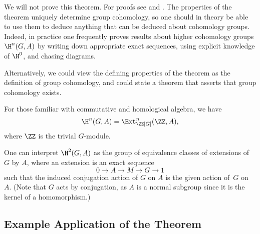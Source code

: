 We will not prove this theorem.  For proofs see
\cite[Atiyah-Wall]{cassels-frohlich} and
\cite[Ch.~7]{serre:localfields}. The properties of the theorem
uniquely determine group cohomology, so one should in theory be able
to use them to deduce anything that can be deduced about cohomology
groups.  Indeed, in practice one frequently proves results about
higher cohomology groups $\H^n(G,A)$ by writing down appropriate exact
sequences, using explicit knowledge of $\H^0$, and chasing diagrams.

\begin{remark}
  Alternatively, we could view the defining properties of the theorem
  as the definition of group cohomology, and could state a theorem
  that asserts that group cohomology exists.
\end{remark}

\begin{remark}
  For those familiar with commutative and homological algebra, we have
  \[
    \H^n(G,A) = \Ext^n_{\ZZ[G]}(\ZZ, A),
  \]
  where $\ZZ$ is the trivial $G$-module.
\end{remark}

\begin{remark}
  One can interpret $\H^2(G,A)$ as the group of equivalence classes of
  extensions of $G$ by $A$, where an extension is an exact sequence
  \[0\to A \to M \to G \to 1\] such that the induced conjugation action
  of $G$ on $A$ is the given action of~$G$ on~$A$.
  (Note that $G$ acts by conjugation, as $A$ is a normal
  subgroup since it is the kernel of a homomorphism.)
\end{remark}

\subsection{Example Application of the Theorem}


